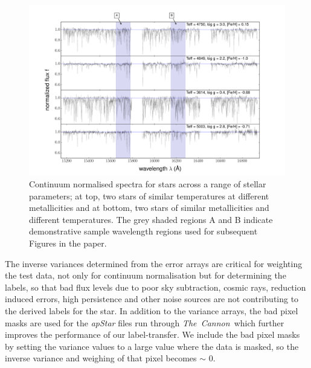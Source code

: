 \documentclass[12pt, preprint]{aastex}
\newcommand{\tc}{\textsl{The~Cannon}}
\begin{document}

\begin{figure}[h!]
  \includegraphics[width=\hsize]{./plots/four_examples3.pdf}
\caption{Continuum normalised spectra for stars across a range of stellar parameters; at top, two stars of similar temperatures at different metallicities and at bottom, two stars of similar metallicities and different temperatures. The grey shaded regions A and B indicate demonstrative sample wavelength regions used for subsequent Figures in the paper.}
\label{fig:norm}
\end{figure}


The inverse variances determined from the error arrays are critical for weighting the test data, not only for continuum normalisation but for determining the labels, so that bad flux levels due to poor sky subtraction, cosmic rays, reduction induced errors, high persistence and other noise sources are not contributing to the derived labels for the star. In addition to the variance arrays, the bad pixel masks are used for the \textit{apStar} files run through \tc\, which further improves the performance of our label-transfer. We include the bad pixel masks by setting the variance values to a large value where the data is masked, so the inverse variance and weighing of that pixel becomes $\sim$ 0. 
\end{document}
